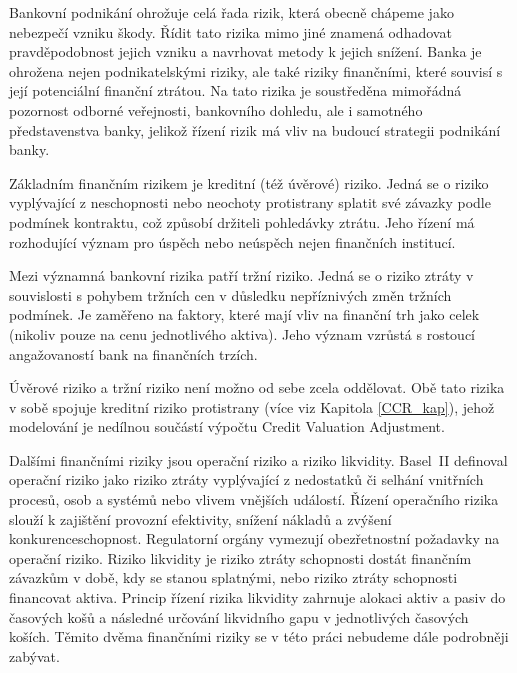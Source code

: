 \documentclass[a4paper,12pt]{report}
\theoremstyle{definition} \newtheorem{definice}[veta]{Definice}
\theoremstyle{remark}
\begin{document}
Bankovní podnikání ohrožuje celá řada rizik, která obecně chápeme jako nebezpečí vzniku škody. 
Řídit tato rizika mimo jiné znamená odhadovat pravděpodobnost jejich vzniku a navrhovat metody k jejich snížení.
Banka je ohrožena nejen podnikatelskými riziky, ale také riziky finančními, které souvisí s její potenciální finanční ztrátou. 
Na tato rizika je soustředěna mimořádná pozornost odborné veřejnosti, bankovního dohledu, ale i samotného představenstva banky, jelikož řízení rizik má vliv na budoucí strategii podnikání banky.

Základním finančním rizikem je kreditní (též úvěrové) riziko.
Jedná se o riziko vyplývající z neschopnosti nebo neochoty protistrany splatit své závazky podle podmínek
kontraktu, což způsobí držiteli pohledávky ztrátu.
Jeho řízení má rozhodující význam pro úspěch nebo neúspěch nejen finančních institucí. 

Mezi významná bankovní rizika patří tržní riziko. 
Jedná se o riziko ztráty v souvislosti s pohybem tržních cen v důsledku nepříznivých změn tržních podmínek. 
Je zaměřeno na faktory, které mají vliv na finanční trh jako celek (nikoliv pouze na cenu jednotlivého aktiva).
Jeho význam vzrůstá s rostoucí angažovaností bank na finančních trzích. 

Úvěrové riziko a tržní riziko není možno od sebe zcela oddělovat.
Obě tato rizika v sobě spojuje kreditní riziko protistrany (více viz Kapitola \ref{CCR_kap}), jehož modelování je nedílnou součástí výpočtu Credit Valuation Adjustment. 

Dalšími finančními riziky jsou operační riziko a riziko likvidity.
Basel~II %
definoval operační riziko jako riziko ztráty vyplývající z nedostatků či selhání vnitřních procesů, osob a systémů nebo vlivem vnějších událostí.
Řízení operačního rizika slouží k zajištění provozní efektivity, snížení nákladů a zvýšení konkurenceschopnost.
Regulatorní orgány vymezují obezřetnostní požadavky na operační riziko.
Riziko likvidity je %
riziko ztráty schopnosti dostát finančním závazkům v době, kdy se stanou splatnými, nebo riziko ztráty schopnosti financovat aktiva.
Princip řízení rizika likvidity zahrnuje alokaci aktiv a pasiv do časových košů a následné určování likvidního gapu v jednotlivých časových koších. 
Těmito dvěma finančními riziky se v této práci nebudeme dále podrobněji zabývat.
\end{document}
